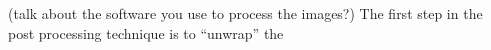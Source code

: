 (talk about the software you use to process the images?)
The first step in the post processing technique is to ``unwrap'' the 
\cite{schindelin2012fiji}
